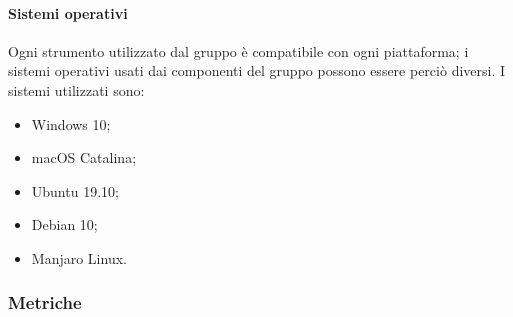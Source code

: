 \documentclass[../norme-di-progetto.tex]{subfiles}
\begin{document}
\paragraph{Sistemi operativi}
Ogni strumento utilizzato dal gruppo è compatibile con ogni piattaforma; i sistemi operativi usati dai componenti del gruppo possono essere perciò diversi. I sistemi utilizzati sono:
\begin{itemize}
  \item Windows 10;
  \item macOS Catalina;
  \item Ubuntu 19.10;
  \item Debian 10;
  \item Manjaro Linux.
\end{itemize}

\subsubsection{Metriche}
\end{document}
